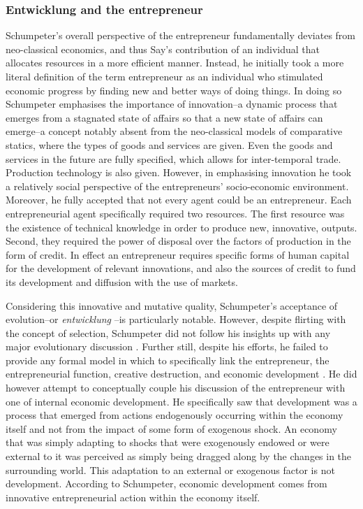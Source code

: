 \subsubsection{Entwicklung and the entrepreneur}

Schumpeter's overall perspective of the entrepreneur fundamentally deviates from neo-classical economics, and thus Say's contribution of an individual that allocates resources in a more efficient manner. Instead, he initially took a more literal definition of the term entrepreneur as an individual who stimulated economic progress by finding new and better ways of doing things. In doing so Schumpeter emphasises the importance of innovation--a dynamic process that emerges from a stagnated state of affairs so that a new state of affairs can emerge--a concept notably absent from the neo-classical models of comparative statics, where the types of goods and services are given. Even the goods and services in the future are fully specified, which allows for inter-temporal trade. Production technology is also given. However, in emphasising innovation he took a relatively social perspective of the entrepreneurs' socio-economic environment. Moreover, he fully accepted that not every agent could be an entrepreneur. Each entrepreneurial agent specifically required two resources. The first resource was the existence of technical knowledge in order to produce new, innovative, outputs. Second, they required the power of disposal over the factors of production in the form of credit. In effect an entrepreneur requires specific forms of human capital for the development of relevant innovations, and also the sources of credit to fund its development and diffusion with the use of markets.

Considering this innovative and mutative quality, Schumpeter's acceptance of evolution--or \emph{entwicklung} \citep{Schumpeter2005}--is particularly notable. However, despite flirting with the concept of selection, Schumpeter did not follow his insights up with any major evolutionary discussion \citep{SmelsterSwedberg2005}. Further still, despite his efforts, he failed to provide any formal model in which to specifically link the entrepreneur, the entrepreneurial function, creative destruction, and economic development \citep{Witt2002}. He did however attempt to conceptually couple his discussion of the entrepreneur with one of internal economic development. He specifically saw that development was a process that emerged from actions endogenously occurring within the economy itself and not from the impact of some form of exogenous shock. An economy that was simply adapting to shocks that were exogenously endowed or were external to it was perceived as simply being dragged along by the changes in the surrounding world. This adaptation to an external or exogenous factor is not development. According to Schumpeter, economic development comes from innovative entrepreneurial action within the economy itself.


